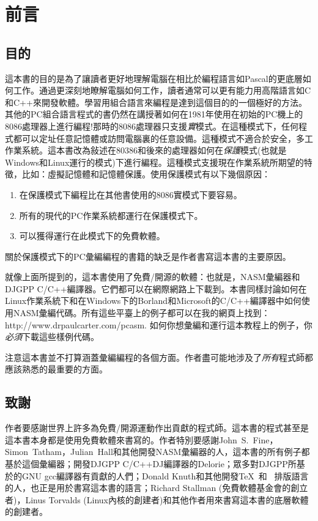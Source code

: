 
\chapter{前言}

\section*{目的}

這本書的目的是為了讓讀者更好地理解電腦在相比於編程語言如Pascal的更底層如何工作。通過更深刻地瞭解電腦如何工作，讀者通常可以更有能力用高階語言如C和C++來開發軟體。學習用組合語言來編程是達到這個目的的一個極好的方法。其他的PC組合語言程式的書仍然在講授著如何在1981年使用在初始的PC機上的8086處理器上進行編程!那時的8086處理器只支援\emph{實}模式。在這種模式下，任何程式都可以定址任意記憶體或訪問電腦裏的任意設備。這種模式不適合於安全，多工作業系統。這本書改為敍述在80386和後來的處理器如何在\emph{保護}模式(也就是Windows和Linux運行的模式)下進行編程。這種模式支援現在作業系統所期望的特徵，比如：虛擬記憶體和記憶體保護。使用保護模式有以下幾個原因：
\begin{enumerate}
\item 在保護模式下編程比在其他書使用的8086實模式下要容易。
\item 所有的現代的PC作業系統都運行在保護模式下。
\item 可以獲得運行在此模式下的免費軟體。
\end{enumerate}
關於保護模式下的PC彙編編程的書籍的缺乏是作者書寫這本書的主要原因。

就像上面所提到的，這本書使用了免費/開源的軟體：也就是，NASM彙編器和DJGPP C/C++編譯器。它們都可以在網際網路上下載到。本書同樣討論如何在Linux作業系統下和在Windows下的Borland和Microsoft的C/C++編譯器中如何使用NASM彙編代碼。所有這些平臺上的例子都可以在我的網頁上找到：
{\code http://www.drpaulcarter.com/pcasm}.
如何你想彙編和運行這本教程上的例子，你\emph{必須}下載這些樣例代碼。

注意這本書並不打算涵蓋彙編編程的各個方面。作者盡可能地涉及了\emph{所有}程式師都應該熟悉的最重要的方面。

\section*{致謝}

作者要感謝世界上許多為免費/開源運動作出貢獻的程式師。這本書的程式甚至是這本書本身都是使用免費軟體來書寫的。作者特別要感謝John~S.~Fine，
Simon~Tatham，Julian~Hall和其他開發NASM彙編器的人，這本書的所有例子都基於這個彙編器；開發DJGPP
C/C++DJ編譯器的Delorie；眾多對DJGPP所基於的GNU
gcc編譯器有貢獻的人們；Donald Knuth和其他開發\TeX\ 和 \LaTeXe\
排版語言的人，也正是用於書寫這本書的語言；Richard Stallman
(免費軟體基金會的創立者)，Linus Torvalds
(Linux內核的創建者)和其他作者用來書寫這本書的底層軟體的創建者。

